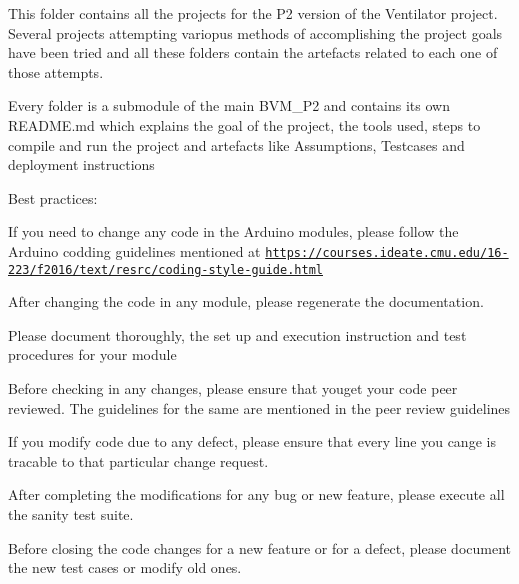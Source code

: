 This folder contains all the projects for the P2 version of the Ventilator project. Several projects attempting variopus methods of accomplishing the project goals have been tried and all these folders contain the artefacts related to each one of those attempts.

Every folder is a submodule of the main B\+V\+M\+\_\+\+P2 and contains its own R\+E\+A\+D\+M\+E.\+md which explains the goal of the project, the tools used, steps to compile and run the project and artefacts like Assumptions, Testcases and deployment instructions

Best practices\+:


\begin{DoxyEnumerate}
\item If you need to change any code in the Arduino modules, please follow the Arduino codding guidelines mentioned at \href{https://courses.ideate.cmu.edu/16-223/f2016/text/resrc/coding-style-guide.html}{\tt https\+://courses.\+ideate.\+cmu.\+edu/16-\/223/f2016/text/resrc/coding-\/style-\/guide.\+html}
\item After changing the code in any module, please regenerate the documentation.
\item Please document thoroughly, the set up and execution instruction and test procedures for your module
\item Before checking in any changes, please ensure that youget your code peer reviewed. The guidelines for the same are mentioned in the peer review guidelines
\item If you modify code due to any defect, please ensure that every line you cange is tracable to that particular change request.
\item After completing the modifications for any bug or new feature, please execute all the sanity test suite.
\item Before closing the code changes for a new feature or for a defect, please document the new test cases or modify old ones. 
\end{DoxyEnumerate}